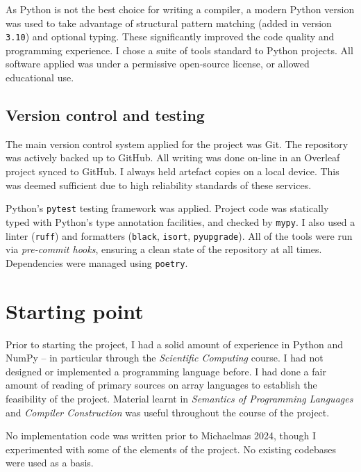 As Python is not the best choice for writing a compiler, a modern Python version was used to take advantage of structural pattern matching (added in version \texttt{3.10}) and optional typing. These significantly improved the code quality and programming experience. 
I chose a suite of tools standard to Python projects. All software applied was under a permissive open-source license, or allowed educational use.

\subsection{Version control and testing}

The main version control system applied for the project was Git. The repository was actively backed up to GitHub. All writing was done on-line in an Overleaf project synced to GitHub. I always held artefact copies on a local device. This was deemed sufficient due to high reliability standards of these services. 

Python's \texttt{pytest} testing framework was applied.
Project code was statically typed with Python's type annotation facilities, and checked by \texttt{mypy}. I also used a linter (\texttt{ruff}) and formatters (\texttt{black}, \texttt{isort}, \texttt{pyupgrade}). All of the tools were run via \textit{pre-commit hooks}, ensuring a clean state of the repository at all times. Dependencies were managed using \texttt{poetry}.



\section{Starting point}
\label{starting-point}

Prior to starting the project, I had a solid amount of experience in Python and NumPy -- in particular through the \textit{Scientific Computing} course. I had not designed or implemented a programming language before. I had done a fair amount of reading of primary sources on array languages to establish the feasibility of the project. Material learnt in \textit{Semantics of Programming Languages} and \textit{Compiler Construction} was useful throughout the course of the project.

No implementation code was written prior to Michaelmas 2024, though I experimented with some of the elements of the project. No existing codebases were used as a basis. 
